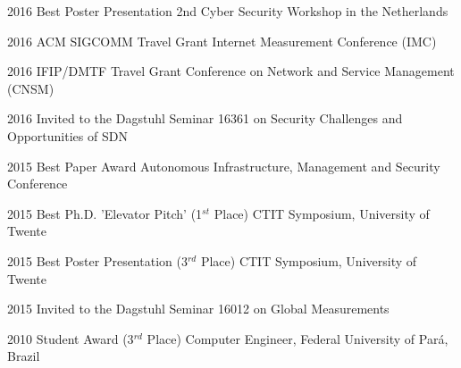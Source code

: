 \documentclass[print]{styles/friggeri-cv-mac} %
\begin{document}
\begin{entrylist}

\vspace{-0.3cm}
\entry
{2016}
{Best Poster Presentation}
{2nd Cyber Security Workshop in the Netherlands}

\vspace{-0.3cm}
\entry
{2016}
{ACM SIGCOMM Travel Grant}
{Internet Measurement Conference (IMC)}

\vspace{-0.3cm}
\entry
{2016}
{IFIP/DMTF Travel Grant}
{Conference on Network and Service Management (CNSM)}

\vspace{-0.3cm}
\entry
{2016}
{Invited to the Dagstuhl Seminar 16361}
{on Security Challenges and Opportunities of SDN}


\vspace{-0.3cm}
\entry
{2015}
{Best Paper Award}
{Autonomous Infrastructure, Management and Security Conference}

\vspace{-0.3cm}
\entry
{2015}
{Best Ph.D. 'Elevator Pitch' (1$^{st}$ Place)}
{CTIT Symposium, University of Twente}

\vspace{-0.3cm}
\entry
{2015}
{Best Poster Presentation (3$^{rd}$ Place)}
{CTIT Symposium, University of Twente}

\vspace{-0.3cm}
\entry
{2015}
{Invited to the Dagstuhl Seminar 16012}
{on Global Measurements}


\vspace{-0.3cm}
\entry
{2010}
{Student Award (3$^{rd}$ Place)}
{Computer Engineer, Federal University of Pará, Brazil}

\end{entrylist}

\end{document}
